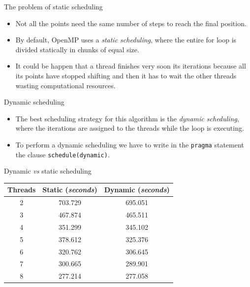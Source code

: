 \documentclass{beamer}
\begin{document}
\begin{frame}{The problem of static scheduling}

\begin{itemize}
\item
Not all the points need the same number of steps to reach the final position.
\item
By default, OpenMP uses a \textit{static scheduling}, where the entire for loop is divided statically in chunks of equal size.
\item
It could be happen that a thread finishes very soon its iterations because all its points have stopped shifting and then it has to wait the other threads wasting computational resources.
\end{itemize}

\end{frame}


\begin{frame}[fragile]{Dynamic scheduling}

\begin{itemize}
\item
The best scheduling strategy for this algorithm is the \textit{dynamic scheduling}, where the iterations are assigned to the threads while the loop is executing.
\item
To perform a dynamic scheduling we have to write in the \verb"pragma" statement the clause \verb"schedule(dynamic)".
\end{itemize}

\end{frame}


\begin{frame}{Dynamic \textit{vs} static scheduling}

\begin{table}[H]
\centering
\begin{tabular}{ccc}
\hline
\textbf{Threads} & \textbf{Static} (\textit{seconds}) & \textbf{Dynamic} (\textit{seconds}) \\
\hline
2 & 703.729 & 695.051 \\
3 & 467.874 & 465.511 \\
4 & 351.299 & 345.102 \\
5 & 378.612 & 325.376 \\
6 & 320.762 & 306.645 \\
7 & 300.665 & 289.901 \\
8 & 277.214 & 277.058 \\
\hline
\end{tabular}
\end{table}

\end{frame}
\end{document}
